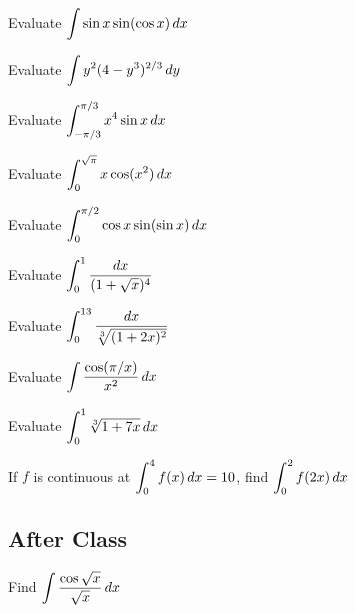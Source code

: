 \documentclass[notes]{subfiles}
\begin{document}
		\begin{ex}
			Evaluate $\displaystyle \int \sin x\sin (\cos x)\,dx$
		\end{ex}
			\newpage
			
		\begin{ex}
			Evaluate $\displaystyle \int y^2(4-y^3)^{2/3}\,dy$
		\end{ex}
			
		\begin{ex}
			Evaluate $\displaystyle \int_{-\pi/3}^{\pi/3} x^4\sin x\,dx$
		\end{ex}
			
		\begin{ex}
			Evaluate $\displaystyle \int_0^{\sqrt{\pi}} x\cos (x^2)\, dx$
		\end{ex}
			\newpage
			
		\begin{ex}
			Evaluate $\displaystyle \int_0^{\pi/2}\cos x \sin (\sin x)\, dx$
		\end{ex}
			
		\begin{ex}
			Evaluate $\displaystyle \int_0^1 \dfrac{dx}{(1+\sqrt{x})^4}$
		\end{ex}
			
		\begin{ex}
			Evaluate $\displaystyle \int_0^{13} \dfrac{dx}{\sqrt[3]{(1+2x)^2}}$
		\end{ex}
			\newpage
			
		\begin{ex}
			Evaluate $\displaystyle \int \dfrac{\cos (\pi/x)}{x^2}\,dx$
		\end{ex}
			
		\begin{ex}
			Evaluate $\displaystyle \int_0^1 \sqrt[3]{1+7x}\, dx$
		\end{ex}
		
		\begin{ex}
			If $f$ is continuous at $\displaystyle \int_0^4 f(x)\, dx = 10$, find $\displaystyle \int_0^2 f(2x)\, dx$
		\end{ex}
			\newpage
			
	\subsection*{After Class}
		\begin{ex}
			Find $\displaystyle \int \dfrac{\cos \sqrt{x}}{\sqrt{x}}\, dx$
		\end{ex}
			
\end{document}
